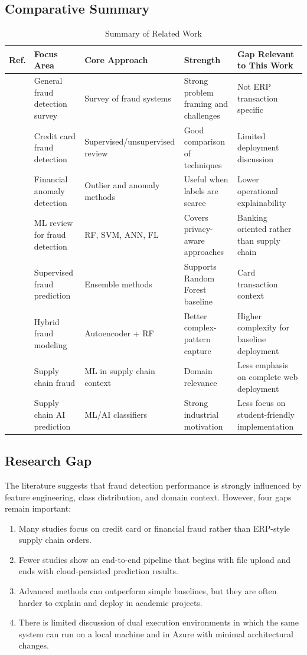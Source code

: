 \documentclass[a4paper,12pt]{article}
\begin{document}
\subsection{Comparative Summary}
\begin{table}[H]
\centering
\caption{Summary of Related Work}
\begin{tabularx}{\textwidth}{>{\raggedright\arraybackslash}p{0.8cm} Y Y Y Y}
\toprule
\textbf{Ref.} & \textbf{Focus Area} & \textbf{Core Approach} & \textbf{Strength} & \textbf{Gap Relevant to This Work} \\
\midrule
[1] & General fraud detection survey & Survey of fraud systems & Strong problem framing and challenges & Not ERP transaction specific \\
[2] & Credit card fraud detection & Supervised/unsupervised review & Good comparison of techniques & Limited deployment discussion \\
[3] & Financial anomaly detection & Outlier and anomaly methods & Useful when labels are scarce & Lower operational explainability \\
[4] & ML review for fraud detection & RF, SVM, ANN, FL & Covers privacy-aware approaches & Banking oriented rather than supply chain \\
[5] & Supervised fraud prediction & Ensemble methods & Supports Random Forest baseline & Card transaction context \\
[6] & Hybrid fraud modeling & Autoencoder + RF & Better complex-pattern capture & Higher complexity for baseline deployment \\
[7] & Supply chain fraud & ML in supply chain context & Domain relevance & Less emphasis on complete web deployment \\
[8] & Supply chain AI prediction & ML/AI classifiers & Strong industrial motivation & Less focus on student-friendly implementation \\
\bottomrule
\end{tabularx}
\end{table}

\subsection{Research Gap}
The literature suggests that fraud detection performance is strongly influenced by feature engineering, class distribution, and domain context. However, four gaps remain important:
\begin{enumerate}[noitemsep]
    \item Many studies focus on credit card or financial fraud rather than ERP-style supply chain orders.
    \item Fewer studies show an end-to-end pipeline that begins with file upload and ends with cloud-persisted prediction results.
    \item Advanced methods can outperform simple baselines, but they are often harder to explain and deploy in academic projects.
    \item There is limited discussion of dual execution environments in which the same system can run on a local machine and in Azure with minimal architectural changes.
\end{enumerate}
\end{document}
